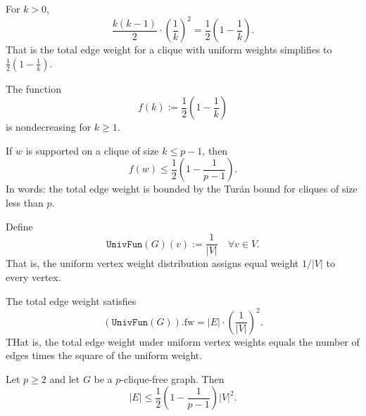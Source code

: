 \begin{lemma}[computation]
  \label{lem:computation}
  \leanok
For \(k > 0\),
\[
\frac{k(k-1)}{2} \cdot \left(\frac{1}{k}\right)^2 = \frac{1}{2}\left(1 - \frac{1}{k}\right).
\]
That is the total edge weight for a clique with uniform weights simplifies to \(\frac{1}{2}(1 - \frac{1}{k})\).
\end{lemma}

\begin{lemma}
  \label{lem:bound_real}
  \leanok
The function
\[
f(k) := \frac{1}{2}\left(1 - \frac{1}{k}\right)
\]
is nondecreasing for \(k \geq 1\).
\end{lemma}

\begin{theorem}
  \label{lem:finale_bound}
  \leanok
If \(w\) is supported on a clique of size \(k \leq p-1\), then
\[
f(w) \leq \frac{1}{2}\left(1 - \frac{1}{p-1}\right).
\]
In words: the total edge weight is bounded by the Turán bound for cliques of size less than \(p\).
\end{theorem}

\begin{definition}
  \label{def:UnivFun}
  \leanok
Define
\[
\texttt{UnivFun}(G)(v) := \frac{1}{|V|} \quad \forall v \in V.
\]
That is, the uniform vertex weight distribution assigns equal weight \(1/|V|\) to every vertex.
\end{definition}

\begin{lemma}
  \label{lem:UnivFun_weight}
  \leanok
The total edge weight satisfies
\[
(\texttt{UnivFun}(G)).\mathrm{fw} = |E| \cdot \left(\frac{1}{|V|}\right)^2.
\]
THat is, the total edge weight under uniform vertex weights equals the number of edges times the square of the uniform weight.
\end{lemma}

\begin{theorem}
  \label{thm:turans}
  \leanok
Let \(p \geq 2\) and let \(G\) be a \(p\)-clique-free graph. Then
\[
|E| \leq \frac{1}{2}\left(1 - \frac{1}{p-1}\right) |V|^2.
\]
\end{theorem}